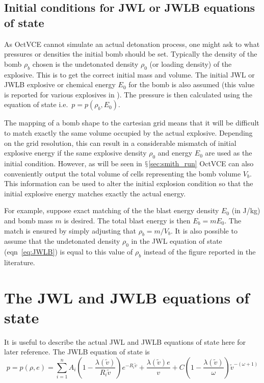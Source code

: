\documentclass[pdftex, 12pt, a4paper]{report}
\begin{document}
\subsection{Initial conditions for JWL or JWLB equations of state}\label{sec:IC_advice}

As OctVCE cannot simulate an actual detonation process, one might ask to what pressures or densities the initial bomb
should be set.  Typically the density of the bomb $\rho_b$ chosen is the undetonated density $\rho_0$ (or loading density) of the 
explosive.  This 
is to get the correct initial mass and volume.  The initial JWL or JWLB explosive or chemical energy $E_0$ for the bomb is also 
assumed (this value is reported for various explosives in \cite{Lee:ae,Baker:im}).  The pressure is then calculated using
the equation of state i.e.\ $p = p\left(\rho_b,E_0\right)$.

The mapping of a bomb shape to the cartesian grid means that it will be difficult to match exactly the same volume occupied by 
the actual explosive.  Depending on the grid resolution, this can result in a considerable mismatch of initial explosive energy 
if the same explosive density $\rho_0$ and energy $E_0$ are used as the initial condition.  However, as will be seen in
$\mathsection$\ref{sec:smith_run} OctVCE can also conveniently output the total volume of cells representing the bomb volume $V_b$.  This 
information can be used to alter the initial explosion condition so that the initial explosive energy matches exactly the
actual energy.

For example, suppose exact matching of the the blast energy density $E_0$ (in J/kg) and bomb mass $m$ is desired.  The 
total blast energy is then $E_b = mE_0$.  The match is ensured by simply adjusting that $\rho_b = m/V_b$.  It is also possible to assume 
that the undetonated density $\rho_0$ in the JWL equation of state (eqn~\ref{eq:JWLB}) is equal to this value of $\rho_b$ instead of 
the figure reported in the literature.  

\section{The JWL and JWLB equations of state}\label{sec:JWLB}

It is useful to describe the actual JWL and JWLB equations of state here for later reference.  The JWLB equation of state is
\begin{equation}\label{eq:JWLB}
p = p\left(\rho, e \right) = \sum_{i = 1}^{n} A_{i}\left(1 - \frac{\lambda\left(\widetilde{v}\right)}{R_{i}\widetilde{v}}\right)e^{-R_{i}\widetilde{v}} + \frac{\lambda\left(\widetilde{v}\right) e}{v} + C\left(1 - \frac{\lambda\left(\widetilde{v}\right)}{\omega} \right){\widetilde{v}}^{-(\omega + 1)}
\end{equation}
\end{document}
